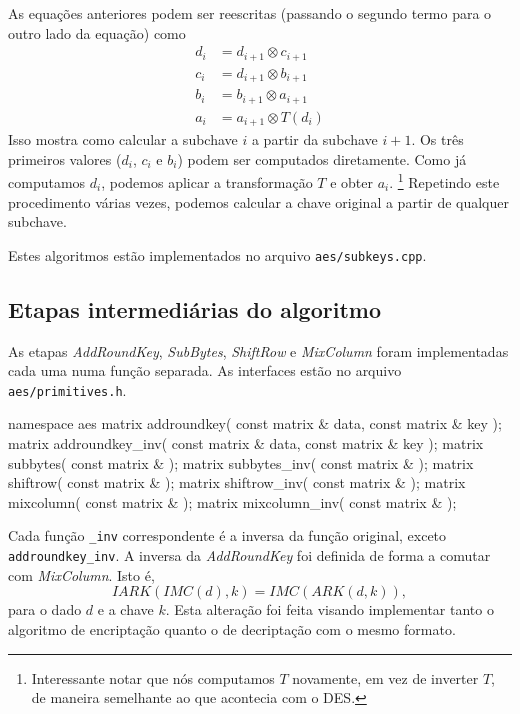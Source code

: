 \documentclass{article}
\newcommand{\xor}{\otimes}
\begin{document}
As equações anteriores podem ser reescritas
(passando o segundo termo para o outro lado da equação)
como
\begin{align*}
    d_i &= d_{i+1} \xor c_{i+1} \\
    c_i &= d_{i+1} \xor b_{i+1} \\
    b_i &= b_{i+1} \xor a_{i+1} \\
    a_i &= a_{i+1} \xor T(d_i)
\end{align*}
Isso mostra como calcular a subchave $i$ a partir da subchave $i+1$.
Os três primeiros valores ($d_i$, $c_i$ e $b_i$)
podem ser computados diretamente.
Como já computamos $d_i$, podemos aplicar a transformação $T$
e obter $a_i$.
\footnote{
    Interessante notar que nós computamos $T$ novamente,
    em vez de inverter $T$,
    de maneira semelhante ao que acontecia com o DES.
}
Repetindo este procedimento várias vezes,
podemos calcular a chave original a partir de qualquer subchave.

Estes algoritmos estão implementados no arquivo \verb"aes/subkeys.cpp".

\subsection{Etapas intermediárias do algoritmo}

As etapas \emph{AddRoundKey}, \emph{SubBytes}, \emph{ShiftRow} e \emph{MixColumn}
foram implementadas cada uma numa função separada.
As interfaces estão no arquivo \verb"aes/primitives.h".

\begin{cppcode}
    namespace aes {
        matrix addroundkey( const matrix & data, const matrix & key );
        matrix addroundkey_inv( const matrix & data, const matrix & key );
        matrix subbytes( const matrix & );
        matrix subbytes_inv( const matrix & );
        matrix shiftrow( const matrix & );
        matrix shiftrow_inv( const matrix & );
        matrix mixcolumn( const matrix & );
        matrix mixcolumn_inv( const matrix & );
    }
\end{cppcode}

Cada função \verb"_inv" correspondente é a inversa da função original,
exceto \verb"addroundkey_inv".
A inversa da \emph{AddRoundKey} foi definida
de forma a comutar com \emph{MixColumn}.
Isto é,
\begin{equation}
    IARK( IMC(d), k ) = IMC( ARK(d, k) ),
    \label{iark-imc}
\end{equation}
para o dado $d$ e a chave $k$.
Esta alteração foi feita visando implementar tanto o algoritmo de encriptação
quanto o de decriptação com o mesmo formato.
\end{document}
